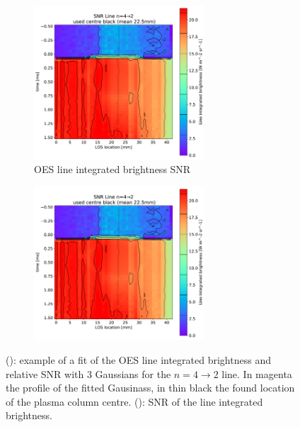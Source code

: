 \begin{figure}[!ht]
\begin{subfigure}{0.14\linewidth}
     \end{subfigure}
     \begin{subfigure}{0.8\linewidth}
         \centering
         \includegraphics[width=0.7\textwidth,trim={20 220 650 400},clip]{Chapters/chapter3/figs/line4SNR.jpg}
         \caption{OES line integrated brightness SNR}
         \label{fig:sampling4b}
     \end{subfigure}
     \begin{subfigure}{0.095\linewidth}
         \vspace*{-10mm}
         \hspace*{-20mm}
         \includegraphics[width=0.7\textwidth,trim={3000 0 125 40},clip]{Chapters/chapter3/figs/line4SNR.jpg}
     \end{subfigure}
        \caption{(): example of a fit of the OES line integrated brightness and relative SNR with 3 Gaussians for the $n=4\rightarrow 2$ line. In magenta the profile of the fitted Gausinass, in thin black the found location of the plasma column centre. (): SNR of the line integrated brightness.}
        \label{fig:sampling4}
\end{figure}


